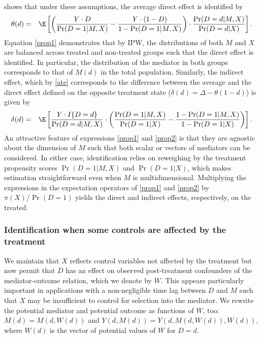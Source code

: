 \documentclass[nojss]{jss}
\begin{document}
\citet{Hu2014} shows that under these assumptions, the average direct effect is identified by
\begin{eqnarray}\label{prop1}
\theta (d) &=& \E\left[ \left( \frac{Y\cdot D}{\Pr (D=1|M,X)}-\frac{Y\cdot (1-D)}{%
  1-\Pr (D=1|M,X)}\right) \cdot \frac{\Pr (D=d|M,X)}{\Pr (D=d|X)}\right].
\end{eqnarray}
Equation \eqref{prop1} demonstrates that by IPW, the distributions of both $M$ and $X$ are balanced across treated and non-treated groups such that the direct effect is identified. In particular, the distribution of the mediator in both groups corresponds to that of $M(d)$ in the total population. Similarly, the indirect effect, which by \eqref{ate} corresponds to the difference between the average and the direct effect defined on the opposite treatment state ($\delta(d)=\Delta-\theta(1-d)$) is given by
\begin{eqnarray}\label{prop2}
\delta (d)&=&\E\left[ \frac{Y\cdot I\{D=d\}}{\Pr (D=d|M,X)}\cdot \left(\frac{\Pr(D=1|M,X)}{\Pr (D=1|X)}-\frac{1-\Pr(D=1|M,X) }{1-\Pr(D=1|X)}\right)\right].
\end{eqnarray}
An attractive feature of expressions \eqref{prop1} and \eqref{prop2} is that they are agnostic about the dimension of $M$ such that both scalar or vectors of mediators can be considered. In either case, identification relies on reweighing by the treatment propensity scores  $\Pr (D=1|M,X)$ and $\Pr (D=1|X)$, which makes estimation straightforward even when $M$ is multidimensional. Multiplying the expressions in the expectation operators of \eqref{prop1} and \eqref{prop2} by $\pi(X)/\Pr(D=1)$ yields the direct and indirect effects, respectively, on the treated.

\subsubsection{Identification when some controls are affected by the treatment}\label{posttreatconf}

We maintain that $X$ reflects control variables not affected by the treatment but now permit that $D$ has an effect on observed post-treatment confounders of the mediator-outcome relation, which we denote by  $W$. This appears particularly important in applications with a non-negligible time lag between $D$ and $M$ such that $X$ may be insufficient to control for selection into the mediator. We rewrite the potential mediator and potential outcome as functions of $W$, too: $M(d)=M(d,W(d))$ and $Y(d,M(d))=Y(d,M(d,W(d)),W(d))$, where $W(d)$ is the vector of potential values of $W$ for $D=d$.
\end{document}
